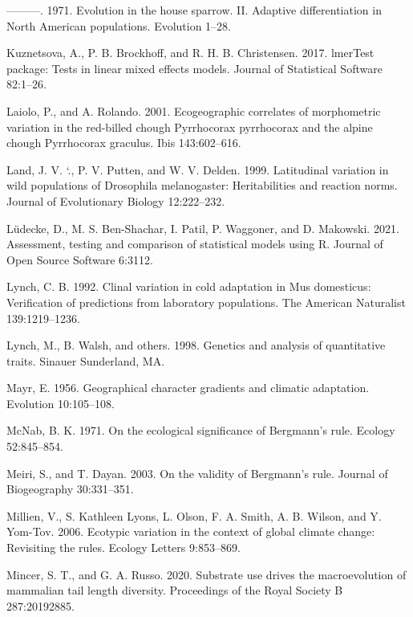 \documentclass[]{article}
\begin{document}
\leavevmode\hypertarget{ref-Johnston1971}{}%
---------. 1971. Evolution in the house sparrow. II. Adaptive
differentiation in North American populations. Evolution 1--28.

\leavevmode\hypertarget{ref-Kuznetsova2017}{}%
Kuznetsova, A., P. B. Brockhoff, and R. H. B. Christensen. 2017.
lmerTest package: Tests in linear mixed effects models. Journal of
Statistical Software 82:1--26.

\leavevmode\hypertarget{ref-Laiolo2001}{}%
Laiolo, P., and A. Rolando. 2001. Ecogeographic correlates of
morphometric variation in the red-billed chough Pyrrhocorax pyrrhocorax
and the alpine chough Pyrrhocorax graculus. Ibis 143:602--616.

\leavevmode\hypertarget{ref-Land1999}{}%
Land, J. V. `., P. V. Putten, and W. V. Delden. 1999. Latitudinal
variation in wild populations of Drosophila melanogaster: Heritabilities
and reaction norms. Journal of Evolutionary Biology 12:222--232.

\leavevmode\hypertarget{ref-Luxfcdecke2021}{}%
Lüdecke, D., M. S. Ben-Shachar, I. Patil, P. Waggoner, and D. Makowski.
2021. Assessment, testing and comparison of statistical models using R.
Journal of Open Source Software 6:3112.

\leavevmode\hypertarget{ref-Lynch1992}{}%
Lynch, C. B. 1992. Clinal variation in cold adaptation in Mus
domesticus: Verification of predictions from laboratory populations. The
American Naturalist 139:1219--1236.

\leavevmode\hypertarget{ref-Lynch1998}{}%
Lynch, M., B. Walsh, and others. 1998. Genetics and analysis of
quantitative traits. Sinauer Sunderland, MA.

\leavevmode\hypertarget{ref-Mayr1956}{}%
Mayr, E. 1956. Geographical character gradients and climatic adaptation.
Evolution 10:105--108.

\leavevmode\hypertarget{ref-McNab1971}{}%
McNab, B. K. 1971. On the ecological significance of Bergmann's rule.
Ecology 52:845--854.

\leavevmode\hypertarget{ref-Meiri2003}{}%
Meiri, S., and T. Dayan. 2003. On the validity of Bergmann's rule.
Journal of Biogeography 30:331--351.

\leavevmode\hypertarget{ref-Millien2006}{}%
Millien, V., S. Kathleen Lyons, L. Olson, F. A. Smith, A. B. Wilson, and
Y. Yom-Tov. 2006. Ecotypic variation in the context of global climate
change: Revisiting the rules. Ecology Letters 9:853--869.

\leavevmode\hypertarget{ref-Mincer2020}{}%
Mincer, S. T., and G. A. Russo. 2020. Substrate use drives the
macroevolution of mammalian tail length diversity. Proceedings of the
Royal Society B 287:20192885.
\end{document}
